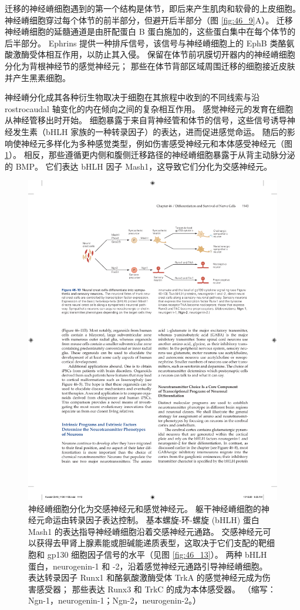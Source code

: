 迁移的神经嵴细胞遇到的第一个结构是体节，即后来产生肌肉和软骨的上皮细胞。 神经嵴细胞穿过每个体节的前半部分，但避开后半部分（图 \ref{fig:46_9}A）。 迁移神经嵴细胞的延髓通道是由肝配蛋白 B 蛋白施加的，这些蛋白集中在每个体节的后半部分。 Ephrins 提供一种排斥信号，该信号与神经嵴细胞上的 EphB 类酪氨酸激酶受体相互作用，以防止其入侵。 保留在体节前巩膜切开器内的神经嵴细胞分化为背根神经节的感觉神经元； 那些在体节背部区域周围迁移的细胞接近皮肤并产生黑素细胞。

神经嵴分化成其各种衍生物取决于细胞在其旅程中收到的不同线索与沿 rostrocaudal 轴变化的内在倾向之间的复杂相互作用。 感觉神经元的发育在细胞从神经管移出时开始。 细胞暴露于来自背神经管和体节的信号，这些信号诱导神经发生素（bHLH 家族的一种转录因子）的表达，进而促进感觉命运。 
随后的影响使神经元多样化为多种感觉类型，例如伤害感受神经元和本体感受神经元（图 \ref{fig:46_10}）。 
相反，那些遵循更内侧和腹侧迁移路径的神经嵴细胞暴露于从背主动脉分泌的 BMP。 它们表达 bHLH 因子 Mash1，这导致它们分化为交感神经元。

\begin{figure}[htbp]
	\centering
	\includegraphics[width=0.8\linewidth]{chap46/fig_46_10}
	\caption{神经嵴细胞分化为交感神经元和感觉神经元。 躯干神经嵴细胞的神经元命运由转录因子表达控制。 基本螺旋-环-螺旋 (bHLH) 蛋白 Mash1 的表达指导神经嵴细胞沿着交感神经元通路。 交感神经元可以获得去甲肾上腺素能或胆碱能递质表型，这取决于它们支配的靶细胞和 gp130 细胞因子信号的水平（见图 \ref{fig:46_13}）。 两种 bHLH 蛋白，neurogenin-1 和 -2，沿着感觉神经元通路引导神经嵴细胞。 表达转录因子 Runx1 和酪氨酸激酶受体 TrkA 的感觉神经元成为伤害感受器； 那些表达 Runx3 和 TrkC 的成为本体感受器。 （缩写：Ngn-1，neurogenin-1；Ngn-2，neurogenin-2。）}
	\label{fig:46_10}
\end{figure}


